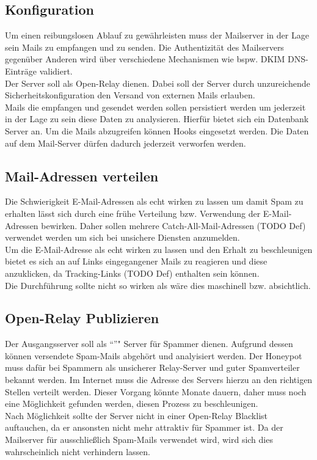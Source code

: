 \documentclass[a4paper,11pt,singlespacing]{article}
\begin{document}
	\subsection{Konfiguration}\label{sec:ProblemstellungKonfiguration}
		Um einen reibungslosen Ablauf zu gewährleisten muss der Mailserver in der Lage sein Mails zu empfangen und zu senden.
		Die Authentizität des Mailservers gegenüber Anderen wird über verschiedene Mechanismen wie bspw. DKIM DNS-Einträge validiert. %
		\\
		Der Server soll als Open-Relay dienen.
		Dabei soll der Server durch unzureichende Sicherheitskonfiguration den Versand von externen Mails erlauben.
		\\
		Mails die empfangen und gesendet werden sollen persistiert werden um jederzeit in der Lage zu sein diese Daten zu analysieren.
		Hierfür bietet sich ein Datenbank Server an. Um die Mails abzugreifen können Hooks eingesetzt werden.
		Die Daten auf dem Mail-Server dürfen dadurch jederzeit verworfen werden.

	\subsection{Mail-Adressen verteilen}\label{sec:ProblemstellungMailsVerteilen}
		Die Schwierigkeit E-Mail-Adressen als echt wirken zu lassen um damit Spam zu erhalten lässt sich durch eine frühe Verteilung bzw. Verwendung der E-Mail-Adressen bewirken.
		Daher sollen mehrere Catch-All-Mail-Adressen (TODO Def) verwendet werden um sich bei unsichere Diensten anzumelden.
		\\
		Um die E-Mail-Adresse als echt wirken zu lassen und den Erhalt zu beschleunigen bietet es sich an auf Links eingegangener Mails zu reagieren und diese anzuklicken, da Tracking-Links (TODO Def) enthalten sein können.
		\\
		Die Durchführung sollte nicht so wirken als wäre dies maschinell bzw. absichtlich.
	
	\subsection{Open-Relay Publizieren}\label{sec:ProblemstellungPublizieren}
		Der Ausgangsserver soll als "`"'" Server für Spammer dienen.
		Aufgrund dessen können versendete Spam-Mails abgehört und analyisiert werden.
		Der Honeypot muss dafür bei Spammern als unsicherer Relay-Server und guter Spamverteiler bekannt werden.
		Im Internet muss die Adresse des Servers hierzu an den richtigen Stellen verteilt werden.
		Dieser Vorgang könnte Monate dauern, daher muss noch eine Möglichkeit gefunden werden, diesen Prozess zu beschleunigen.
		\\
		Nach Möglichkeit sollte der Server nicht in einer Open-Relay Blacklist auftauchen, da er ansonsten nicht mehr attraktiv für Spammer ist.
		Da der Mailserver für ausschließlich Spam-Mails verwendet wird, wird sich dies wahrscheinlich nicht verhindern lassen.
\end{document}
